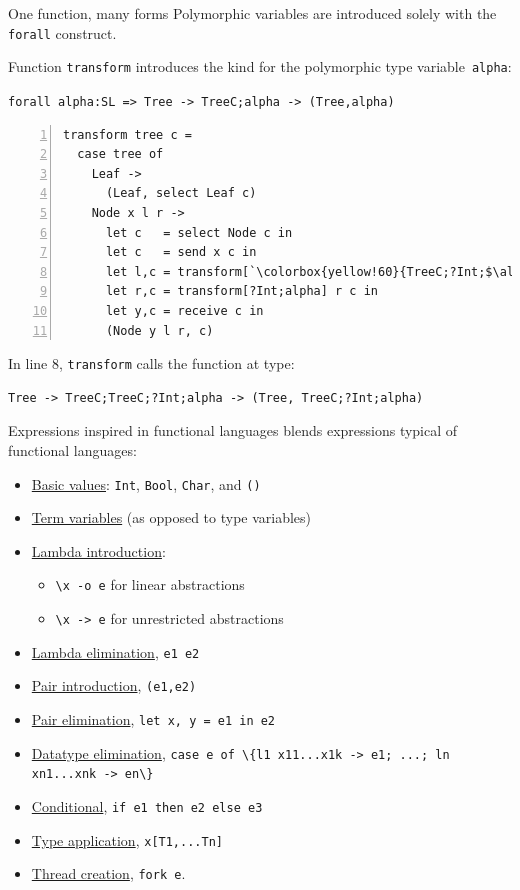 \documentclass[10pt]{beamer}
\begin{document}
\begin{frame}[fragile]{One function, many forms}
	Polymorphic variables are introduced solely with the \lstinline|forall| construct.
	
	Function \lstinline|transform| introduces the kind for the
        polymorphic type variable~\lstinline|alpha|:
        
        \begin{center}
          \lstinline|forall alpha:SL => Tree -> TreeC;alpha -> (Tree,alpha)|
        \end{center}
\pause
\begin{lstlisting}[numbers=left, xleftmargin=0.7cm, escapeinside=\`\`, basicstyle=\sffamily\scriptsize]
transform tree c =
  case tree of
    Leaf ->
      (Leaf, select Leaf c)
    Node x l r ->
      let c   = select Node c in
      let c   = send x c in 
      let l,c = transform[`\colorbox{yellow!60}{TreeC;?Int;$\alpha$}`] l c in
      let r,c = transform[?Int;alpha] r c in
      let y,c = receive c in
      (Node y l r, c)
\end{lstlisting}
\pause
In line 8, \lstinline|transform| calls the function at type:
\begin{lstlisting}
Tree -> TreeC;TreeC;?Int;alpha -> (Tree, TreeC;?Int;alpha)
\end{lstlisting}
	
\end{frame}

\begin{frame}{Expressions {\small \color{mLightBrown}inspired in functional languages}}
\freest{} blends expressions typical of functional languages:
\begin{itemize}
\item \underline{Basic values}: \lstinline|Int|,
  \lstinline|Bool|, \lstinline|Char|, and \lstinline|()|
\item \underline{Term variables} (as opposed to type variables)
\item \underline{Lambda introduction}: 
\begin{itemize}
	\item \lstinline|\x -o e| for linear abstractions
	\item \lstinline|\x -> e| for unrestricted abstractions
\end{itemize}
\item \underline{Lambda elimination}, \lstinline|e1 e2|
\item \underline{Pair introduction}, \lstinline|(e1,e2)| 
\item \underline{Pair elimination},
  \lstinline|let x, y = e1 in e2| %
\item \underline{Datatype elimination},
  \lstinline|case e of \{l1 x11...x1k -> e1; ...; ln xn1...xnk -> en\}|
\item \underline{Conditional}, \lstinline|if e1 then e2 else e3|
\item \underline{Type application}, \lstinline|x[T1,...Tn]|
\item \underline{Thread creation}, \lstinline|fork e|.
\end{itemize}
\end{frame}
\end{document}
